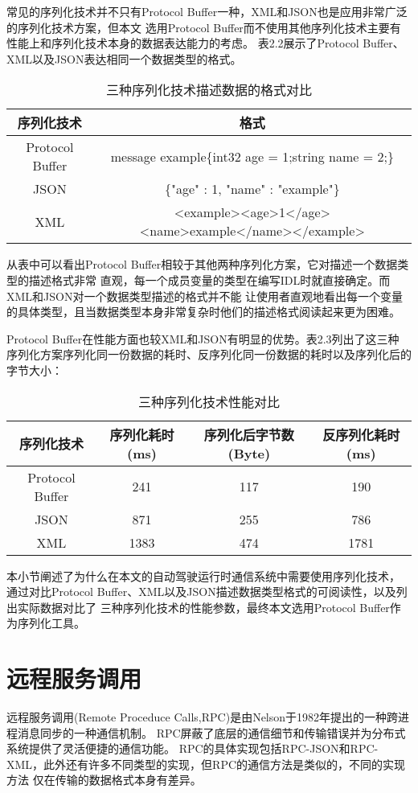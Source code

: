 常见的序列化技术并不只有Protocol Buffer一种，XML和JSON也是应用非常广泛的序列化技术方案，但本文
选用Protocol Buffer而不使用其他序列化技术主要有性能上和序列化技术本身的数据表达能力的考虑。
表2.2展示了Protocol Buffer、XML以及JSON表达相同一个数据类型的格式。
\begin{table}[H]
  \centering\small
  \caption{三种序列化技术描述数据的格式对比\cite{6215346}}
  \label{tab:exampletable}
  \begin{tabular}{cc}
    \toprule
    序列化技术   &  格式                                       \\
    \midrule
    Protocol Buffer & message example\{int32 age = 1;string name = 2;\}  \\
    JSON & \{"age" : 1, "name" : "example"\}   \\
    XML & <example><age>1</age><name>example</name></example>       \\
    \bottomrule
  \end{tabular}
\end{table}
从表中可以看出Protocol Buffer相较于其他两种序列化方案，它对描述一个数据类型的描述格式非常
直观，每一个成员变量的类型在编写IDL时就直接确定。而XML和JSON对一个数据类型描述的格式并不能
让使用者直观地看出每一个变量的具体类型，且当数据类型本身非常复杂时他们的描述格式阅读起来更为困难。

Protocol Buffer在性能方面也较XML和JSON有明显的优势。表2.3列出了这三种
序列化方案序列化同一份数据的耗时、反序列化同一份数据的耗时以及序列化后的字节大小\cite{proto}：
\begin{table}[H]
  \centering\small
  \caption{三种序列化技术性能对比}
  \label{tab:exampletable}
  \begin{tabular}{cccc}
    \toprule
    序列化技术 & 序列化耗时(ms) & 序列化后字节数(Byte) & 反序列化耗时(ms)                                       \\
    \midrule
    Protocol Buffer & 241 & 117 & 190 \\
    JSON & 871 & 255 & 786 \\
    XML & 1383 & 474 & 1781 \\
    \bottomrule
  \end{tabular}
\end{table}


本小节阐述了为什么在本文的自动驾驶运行时通信系统中需要使用序列化技术，
通过对比Protocol Buffer、XML以及JSON描述数据类型格式的可阅读性，以及列出实际数据对比了
三种序列化技术的性能参数，最终本文选用Protocol Buffer作为序列化工具。
\section{远程服务调用}
远程服务调用(Remote Proceduce Calls,RPC)是由Nelson于1982年提出的一种跨进程消息同步的一种通信机制\cite{Andrew}。
RPC屏蔽了底层的通信细节和传输错误并为分布式系统提供了灵活便捷的通信功能。
RPC的具体实现包括RPC-JSON和RPC-XML\cite{2011TOWARD,2013Web}，此外还有许多不同类型的实现，但RPC的通信方法是类似的，不同的实现方法
仅在传输的数据格式本身有差异。

